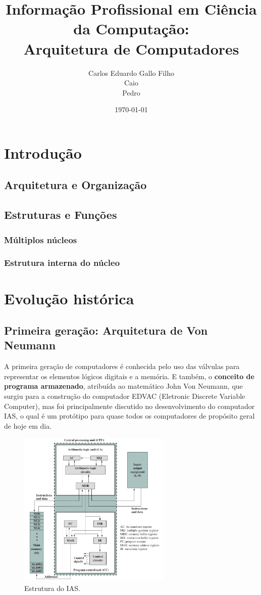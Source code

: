 \documentclass{article}
\title{Informação Profissional em Ciência da Computação:\\
       Arquitetura de Computadores}
\author{Carlos Eduardo Gallo Filho \\
        Caio \\
        Pedro}
\date{\today}
\begin{document}
\maketitle

\section{Introdução}
\subsection{Arquitetura e Organização}
\subsection{Estruturas e Funções}
\subsubsection{Múltiplos núcleos}
\subsubsection{Estrutura interna do núcleo}

\section{Evolução histórica}
\subsection{Primeira geração: Arquitetura de Von Neumann}
A primeira geração de computadores é conhecida pelo uso das válvulas para
representar os elementos lógicos digitais e a memória. E também, o
\textbf{conceito de programa armazenado}, atribuída ao matemático John Von
Neumann, que surgiu para a construção do computador EDVAC (Eletronic Discrete
Variable Computer), mas foi principalmente discutido no desenvolvimento do
computador IAS, o qual é um protótipo para quase todos os computadores de
propósito geral de hoje em dia.

\begin{figure}[h]
    \centering
    \includegraphics[width=0.65\textwidth]{ias.png}
    \caption{Estrutura do IAS.}
\end{figure}
\end{document}
